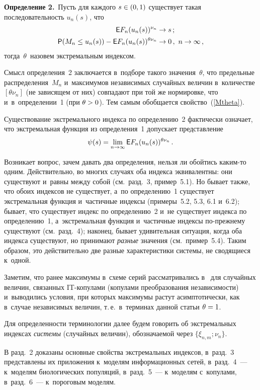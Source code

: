 \begin{multicols}{2}
\smallskip

\noindent
\textbf{Определение 2.}\
Пусть для каждого $s\hm\in (0,1)$ существует такая последовательность $u_n(s)$,
что 
\begin{align*}
{\sf E}F_n(u_n(s))^{\nu_n}&\to s\,;\\
{\sf P}(M_n\le u_n(s))-{\sf E}F_n(u_n(s))^{\theta\nu_n}&\to 0\,,\ 
n\to\infty\,,
\end{align*}
 тогда~$\theta$~назовем экстремальным индексом.

\smallskip

Смысл определения~2 заключается в~подборе такого значения~$\theta$,
что предельные распределения~$M_n$ и~максимумов независимых случайных величин
в~количестве $[\theta\nu_n]$ (не зависящем от них)
совпадают при той же нормировке, что и~в~определении~1 (при $\theta\hm>0$).
Тем самым обобщается свойство~(\ref{Mtheta}).

Существование экстремального индекса по определению~2 фактически означает, что
экстремальная функция из определения~1 допускает представление
$$
\psi(s)=\lim\limits_{n\to\infty}{\sf E}F_n(u_n(s))^{\theta\nu_n}\,.
$$

Возникает вопрос, зачем давать два определения, нельзя ли обойтись ка\-ким-то одним. Действительно,
во многих случаях оба индекса эквивалентны: они существуют и~равны между собой (см.\ разд.~3, пример~5.1).
Но бывает также, что обоих индексов не существует, а~по определению~1 существует экстремальная
функция и~частичные индексы (примеры~5.2, 5.3, 6.1 и~6.2); бывает, что
существует индекс по определению~2
и~не существует индекса по определению~1, а~экстремальная функция
и~частичные индексы по-преж\-не\-му
существуют (см.\ разд.~4); наконец, бывает удивительная ситуация,
когда оба индекса существуют,
но принимают \textit{разные} значения (см.\ пример~5.4). Таким образом, это
действительно две разные характеристики системы, не сводящиеся к~одной.

Заметим, что ранее максимумы в~схеме серий рассматривались
в~\cite{Sav} для случайных величин, связанных IT-ко\-пу\-ла\-ми (копулами
преобразования независимости) и~выводились условия, при которых
максимумы растут асимптотически, как в~случае независимых величин,
т.\,е.\ в~терминах данной \mbox{статьи} $\theta\hm=1$.

Для определенности терминологии далее будем говорить об экстремальных индексах
\textit{системы} (случайных величин), обозначаемой через $\{\xi_{n,m};\nu_n\}$.

В разд.~2 доказаны основные свойства экстремальных индексов,
в~разд.~3 представлены
их приложения к~моделям информационных сетей, в~разд.~4~---
к~моделям биологических популяций,
в~разд.~5~--- к~моделям с~копулами, в~разд.~6~--- к~пороговым моделям.


\end{multicols}
